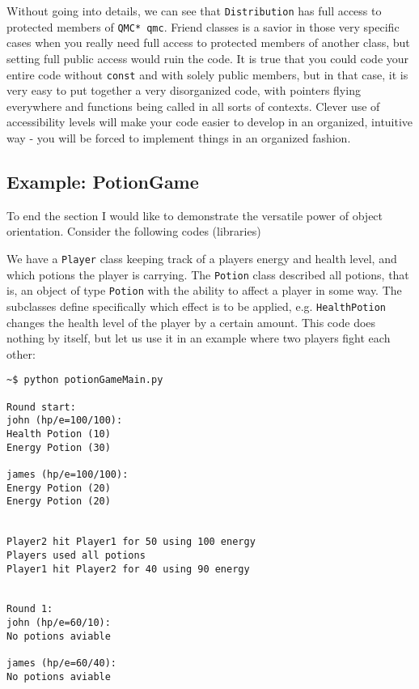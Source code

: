 Without going into details, we can see that \verb+Distribution+ has full access to protected members of \verb+QMC* qmc+. Friend classes is a savior in those very specific cases when you really need full access to protected members of another class, but setting full public access would ruin the code. It is true that you could code your entire code without \verb+const+ and with solely public members, but in that case, it is very easy to put together a very disorganized code, with pointers flying everywhere and functions being called in all sorts of contexts. Clever use of accessibility levels will make your code easier to develop in an organized, intuitive way - you will be forced to implement things in an organized fashion.


\subsection{Example: PotionGame}
\label{sec:PotionGame}

To end the section I would like to demonstrate the versatile power of object orientation. Consider the following codes (libraries)

\vspace{0.5 cm}



We have a \verb+Player+ class keeping track of a players energy and health level, and which potions the player is carrying. The \verb+Potion+ class described all potions, that is, an object of type \verb+Potion+ with the ability to affect a player in some way. The subclasses define specifically which effect is to be applied, e.g. \verb+HealthPotion+ changes the health level of the player by a certain amount. This code does nothing by itself, but let us use it in an example where two players fight each other:

\vspace{0.5 cm}


\begin{verbatim}
~$ python potionGameMain.py 

Round start: 
john (hp/e=100/100):
Health Potion (10)
Energy Potion (30)

james (hp/e=100/100):
Energy Potion (20)
Energy Potion (20)


Player2 hit Player1 for 50 using 100 energy
Players used all potions
Player1 hit Player2 for 40 using 90 energy


Round 1: 
john (hp/e=60/10):
No potions aviable

james (hp/e=60/40):
No potions aviable

\end{verbatim}


